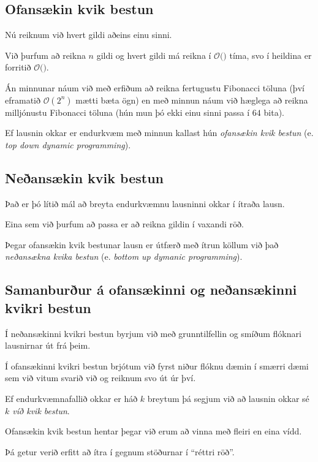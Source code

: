 \subsection{Ofansækin kvik bestun}
{
    {
        \item<1-> Nú reiknum við hvert gildi aðeins einu sinni.
        \item<2-> Við þurfum að reikna $n$ gildi og hvert gildi má reikna í $\mathcal{O}($$)$ tíma, svo í heildina er forritið
            $\mathcal{O}($$)$.
        \item<5-> Án minnunar náum við með erfiðum að reikna fertugustu Fibonacci töluna (því eframatið $\mathcal{O}(2^n)$ mætti bæta ögn)
            en með minnun náum við hæglega að reikna milljónustu Fibonacci töluna (hún mun þó ekki einu sinni passa í $64$ bita).
        \item<6-> Ef lausnin okkar er endurkvæm með minnun kallast hún \emph{ofansækin kvik bestun} (e. \emph{top down dynamic programming}).
    }
}

\subsection{Neðansækin kvik bestun}
{
    {
        \item<1-> Það er þó lítið mál að breyta endurkvæmnu lausninni okkar í ítraða lausn.
        \item<2-> Eina sem við þurfum að passa er að reikna gildin í vaxandi röð.
        \item<3->[] 
        \item<4-> Þegar ofansækin kvik bestunar lausn er útfærð með ítrun köllum við það \emph{neðansækna kvika bestun} 
                    (e. \emph{bottom up dymanic programming}).
    }
}

\subsection{Samanburður á ofansækinni og neðansækinni kvikri bestun}
{
    {
        \item<1-> Í neðansækinni kvikri bestun byrjum við með grunntilfellin og smíðum flóknari lausnirnar út frá þeim.
        \item<2-> Í ofansækinni kvikri bestun brjótum við fyrst niður flóknu dæmin í smærri dæmi sem við vitum svarið við og reiknum svo út úr því.
        \item<3-> Ef endurkvæmnafallið okkar er háð $k$ breytum þá segjum við að lausnin okkar sé \emph{$k$ víð kvik bestun}.
        \item<4-> Ofansækin kvik bestun hentar þegar við erum að vinna með fleiri en eina vídd.
        \item<5-> Þá getur verið erfitt að ítra í gegnum stöðurnar í ``réttri röð''.
    }
}

